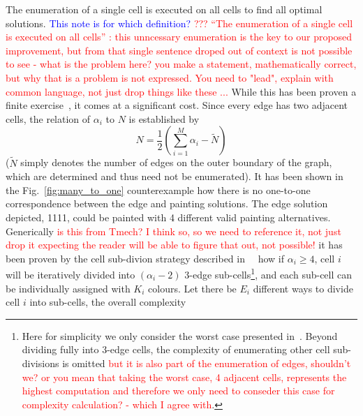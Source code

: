 \documentclass[conference]{IEEEtran}
\begin{document}
The enumeration of a single cell is executed on all cells to find all optimal solutions.
\textcolor{blue}{This note is for which definition? }\textcolor{red}{??? ``The enumeration of a single cell is executed on all cells'' : this unncessary enumeration is the key to our proposed improvement, but from that single sentence droped out of context is not possible to see - what is the problem here? you make a statement, mathematically correct, but why that is a problem is not expressed. You need to "lead", explain with common language, not just drop things like these ...}
While this has been proven a finite exercise~\cite{Yang2020Cellular}, it comes at a significant cost. Since every edge has two adjacent cells, 
the relation of $\alpha_i$ to $N$ is established by
\begin{equation}
N = \frac{1}{2}(\sum\limits_{i=1}^M \alpha_i - \tilde{N})
\end{equation}
($\tilde{N}$ simply denotes the number of edges on the outer boundary of the graph, %
which are determined and thus need not be enumerated). 
It has been shown in the Fig.~\ref{fig:many_to_one} counterexample how there is no one-to-one correspondence between the edge and painting solutions. 
The edge solution depicted, 1111, could be painted with 4 different valid painting alternatives.
Generically \textcolor{red}{is this from Tmech? I think so, so we need to reference it, not just drop it expecting the reader will be able to figure that out, not possible!} it has been proven by the cell sub-divion strategy described in~~\cite{Yang2020Cellular} how if $\alpha_i \geq 4$, cell $i$ will be iteratively divided into $(\alpha_i-2)$ $3$-edge sub-cells\footnote{Here for simplicity we only consider the worst case presented in~\cite{Yang2020Cellular}. Beyond dividing fully into $3$-edge cells, the complexity of enumerating other cell sub-divisions is omitted \textcolor{red}{but it is also part of the enumeration of edges, shouldn't we? or you mean that taking the worst case, 4 adjacent cells, represents the highest computation and therefore we only need to conseder this case for complexity calculation? - which I agree with}.}, and each sub-cell can be individually assigned with $K_i$ colours. Let there be $E_i$ different ways to divide cell $i$ into sub-cells, the overall complexity %
\end{document}

